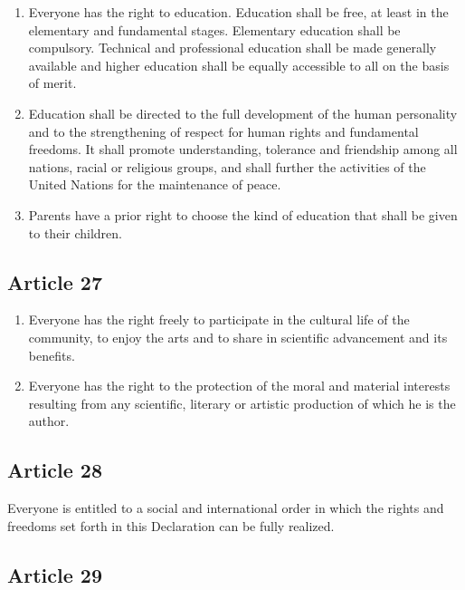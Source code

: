 \documentclass[
  titlepage,
  openright,
  DIV=calc,
  toc=listof,
  listof=nochaptergap]{scrbook}
\begin{document}
\begin{enumerate}
\def\labelenumi{\arabic{enumi}.}
\item
  Everyone has the right to education. Education shall be free, at least
  in the elementary and fundamental stages. Elementary education shall
  be compulsory. Technical and professional education shall be made
  generally available and higher education shall be equally accessible
  to all on the basis of merit.
\item
  Education shall be directed to the full development of the human
  personality and to the strengthening of respect for human rights and
  fundamental freedoms. It shall promote understanding, tolerance and
  friendship among all nations, racial or religious groups, and shall
  further the activities of the United Nations for the maintenance of
  peace.
\item
  Parents have a prior right to choose the kind of education that shall
  be given to their children.
\end{enumerate}

\subsection{Article 27}\label{article-27-4}

\begin{enumerate}
\def\labelenumi{\arabic{enumi}.}
\item
  Everyone has the right freely to participate in the cultural life of
  the community, to enjoy the arts and to share in scientific
  advancement and its benefits.
\item
  Everyone has the right to the protection of the moral and material
  interests resulting from any scientific, literary or artistic
  production of which he is the author.
\end{enumerate}

\subsection{Article 28}\label{article-28-4}

Everyone is entitled to a social and international order in which the
rights and freedoms set forth in this Declaration can be fully realized.

\subsection{Article 29}\label{article-29-4}
\end{document}
